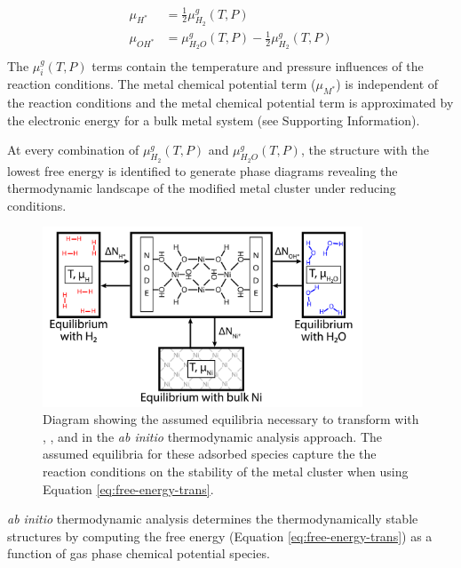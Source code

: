 \documentclass[journal=jctcce,manuscript=article]{achemso}
\begin{document}
\begin{equation}
    \begin{split}
        \mu_{H^{*}} &= \frac{1}{2} \mu_{H_{2}}^{g}(T,P) \\ 
        \mu_{OH^{*}} &= \mu_{H_{2}O}^{g}(T,P) - \frac{1}{2} \mu_{H_{2}}^{g}(T,P) \\
    \end{split}
    \label{eq:chemicalpotentialeq}
\end{equation}
The $\mu_{i}^{g}(T,P)$ terms contain the temperature and pressure influences of the reaction conditions. The metal chemical potential term ($\mu_{M^{*}}$) is independent of the reaction conditions and the metal chemical potential term is approximated by the electronic energy for a bulk metal system (see Supporting Information).





At every combination of $\mu_{H_{2}}^{g}(T,P)$ and $\mu_{H_{2}O}^{g}(T,P)$, the structure with
the lowest free energy is identified to generate phase diagrams revealing the thermodynamic landscape of the modified metal cluster under reducing conditions. 

\begin{figure}[h]
    \centering
    \includegraphics[width=0.85\textwidth]{zi-images/00-General-Graphics/FPT-schematic-full.png}
    \caption{Diagram showing the assumed equilibria necessary to transform with , , and  in the \textit{ab initio} thermodynamic analysis approach. The assumed equilibria for these adsorbed species capture the the reaction conditions on the stability of the metal cluster when using Equation \ref{eq:free-energy-trans}.}
    \label{fig:FPT-process}
\end{figure}

\textit{ab initio} thermodynamic analysis determines the thermodynamically stable structures by computing the free energy (Equation \ref{eq:free-energy-trans}) as a function of gas phase chemical potential species. 
\end{document}
